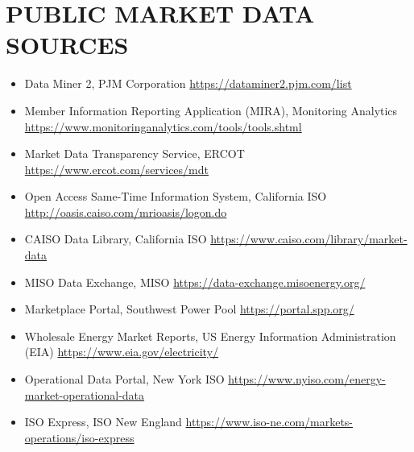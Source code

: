 
\chapter{\uppercase {Public Market Data Sources}}\label{appendix:D}

\begin{itemize}
    \item Data Miner 2, PJM Corporation  \newline \url{https://dataminer2.pjm.com/list}
    \item Member Information Reporting Application (MIRA), Monitoring Analytics \newline \url{https://www.monitoringanalytics.com/tools/tools.shtml}
    \item Market Data Transparency Service, ERCOT \newline \url{https://www.ercot.com/services/mdt}
    \item Open Access Same-Time Information System, California ISO \newline \url{http://oasis.caiso.com/mrioasis/logon.do}
    \item CAISO Data Library, California ISO \newline \url{https://www.caiso.com/library/market-data}
    \item MISO Data Exchange, MISO \newline \url{https://data-exchange.misoenergy.org/}
    \item Marketplace Portal, Southwest Power Pool \newline \url{https://portal.spp.org/}
    \item Wholesale Energy Market Reports, US Energy Information Administration (EIA) \newline \url{https://www.eia.gov/electricity/}
    \item Operational Data Portal, New York ISO \newline \url{https://www.nyiso.com/energy-market-operational-data}
    \item ISO Express, ISO New England \newline \url{https://www.iso-ne.com/markets-operations/iso-express}
\end{itemize}
